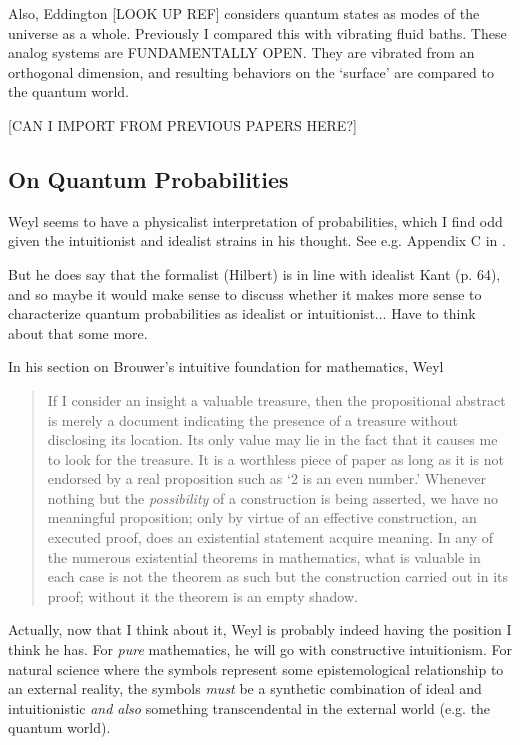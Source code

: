 Also, Eddington [LOOK UP REF] considers quantum states as modes of the universe as a whole.  Previously I compared this with vibrating fluid baths.  These analog systems are FUNDAMENTALLY OPEN.  They are vibrated from an orthogonal dimension, and resulting behaviors on the `surface' are compared to the quantum world.

[CAN I IMPORT FROM PREVIOUS PAPERS HERE?]



\subsection{On Quantum Probabilities}

Weyl seems to have a physicalist interpretation of probabilities, which I find odd given the intuitionist and idealist strains in his thought.  See e.g. Appendix C in \citep{Weyl1949}.

But he does say that the formalist (Hilbert) is in line with idealist Kant (p.  64), and so maybe it would make sense to  discuss whether it makes more sense to characterize quantum probabilities as idealist or intuitionist... Have to think about that some more.

In his section on Brouwer's intuitive foundation for mathematics, Weyl 

\begin{quote}
    If I consider an insight a valuable treasure, then the propositional abstract is merely a document indicating the presence of a treasure without disclosing its location.  Its only value may lie in the fact that it causes me to look for the treasure.  It is a worthless piece of paper as long as it is not endorsed by a real proposition such as `2 is an even number.'  Whenever nothing but the \emph{possibility} of a construction is being asserted, we have no meaningful proposition; only by virtue of an effective construction, an executed proof, does an existential statement acquire meaning.  In any of the numerous existential theorems in mathematics, what is valuable in each case is not the theorem as such but the construction carried out in its proof; without it the theorem is an empty shadow.

    \citep[p. 51]{Weyl1949}
\end{quote}

Actually, now that I think about it, Weyl is probably indeed having the position I think he has.  For \emph{pure} mathematics, he will go with constructive intuitionism.  For natural science where the symbols represent some epistemological relationship to an external reality, the symbols \emph{must} be a synthetic combination of ideal and intuitionistic \emph{and also} something transcendental in the external world (e.g. the quantum world).  

